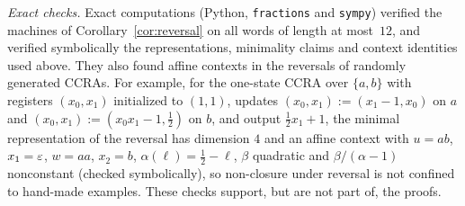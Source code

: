 \emph{Exact checks.} Exact computations (Python, \texttt{fractions} and \texttt{sympy}) verified the machines of Corollary~\ref{cor:reversal} on all words of length at most~$12$, and verified symbolically the representations, minimality claims and context identities used above. They also found affine contexts in the reversals of randomly generated CCRAs. For example, for the one-state CCRA over $\{a,b\}$ with registers $(x_0,x_1)$ initialized to $(1,1)$, updates $(x_0,x_1):=(x_1-1,x_0)$ on $a$ and $(x_0,x_1):=(x_0x_1-1,\frac12)$ on $b$, and output $\frac12x_1+1$, the minimal representation of the reversal has dimension $4$ and an affine context with $u=ab$, $x_1=\varepsilon$, $w=aa$, $x_2=b$, $\alpha(\ell)=\frac12-\ell$, $\beta$ quadratic and $\beta/(\alpha-1)$ nonconstant (checked symbolically), so non-closure under reversal is not confined to hand-made examples. These checks support, but are not part of, the proofs.
